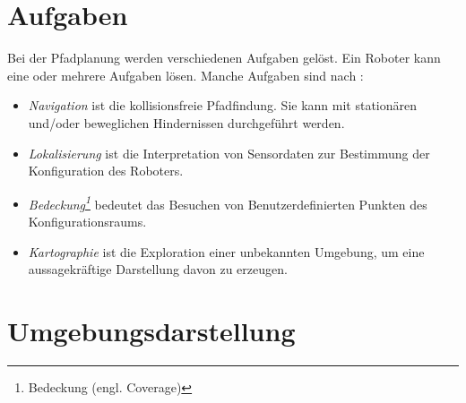 \section{Aufgaben} \label{AufgabenPP}

Bei der Pfadplanung werden verschiedenen Aufgaben gelöst. Ein Roboter kann eine oder mehrere Aufgaben lösen. Manche Aufgaben sind nach \cite[~S. 9,10]{Principles:05}:
\begin{itemize}
	\item \textit{Navigation} ist die kollisionsfreie Pfadfindung. Sie kann mit stationären und/oder beweglichen Hindernissen durchgeführt werden.
	\item \textit{Lokalisierung} ist die Interpretation von Sensordaten zur Bestimmung der Konfiguration des Roboters.
	\item \textit{Bedeckung\footnote{Bedeckung (engl. Coverage)}} bedeutet das Besuchen von Benutzerdefinierten Punkten des Konfigurationsraums.
	\item \textit{Kartographie} ist die Exploration einer unbekannten Umgebung, um eine aussagekräftige Darstellung davon zu erzeugen.
\end{itemize}

\section{Umgebungsdarstellung}

